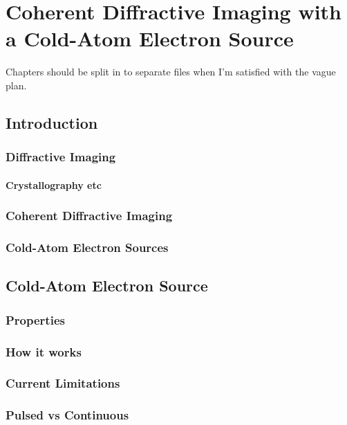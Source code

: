 \part{Coherent Diffractive Imaging with a Cold-Atom Electron Source}

Chapters should be split in to separate files when I'm satisfied with the vague plan.

\chapter{Introduction}

\section{Diffractive Imaging}

\subsection{Crystallography etc}

\section{Coherent Diffractive Imaging}

\section{Cold-Atom Electron Sources}




\chapter{Cold-Atom Electron Source}

\section{Properties}

\section{How it works}

\section{Current Limitations}

\section{Pulsed vs Continuous}

